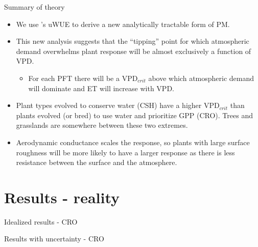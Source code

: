 \documentclass{beamer}
\begin{document}
\begin{frame}{Summary of theory}
  \begin{itemize}
  \item We use \cite{Zhou_2016}'s uWUE to derive a new analytically tractable form of PM.
  \item This new analysis suggests that the ``tipping'' point for which atmospheric demand overwhelms plant response will be almost exclusively a function of VPD.
    \begin{itemize}
    \item For each PFT there will be a VPD$_{crit}$ above which atmospheric demand will dominate and ET will increase with VPD.
    \end{itemize}
  \item Plant types evolved to conserve water (CSH) have a higher VPD$_{crit}$ than plants evolved (or bred) to use water and prioritize GPP (CRO). Trees and grasslands are somewhere between these two extremes.
  \item Aerodynamic conductance scales the response, so plants with large surface roughness will be more likely to have a larger response as there is less resistance between the surface and the atmosphere.
  \end{itemize}
\end{frame}

\section{Results - reality}
{ %
    \begin{frame}[plain]{Idealized results - CRO}
     \end{frame}
}

{ %
    \begin{frame}[plain]{Results with uncertainty - CRO}
     \end{frame}
}
\end{document}
